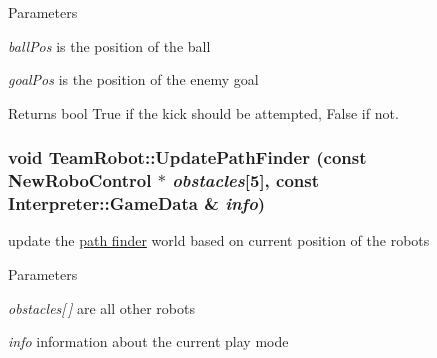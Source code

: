 \begin{DoxyParams}{Parameters}
\item[{\em ballPos}]is the position of the ball \item[{\em goalPos}]is the position of the enemy goal \end{DoxyParams}
\begin{DoxyReturn}{Returns}
bool True if the kick should be attempted, False if not. 
\end{DoxyReturn}
\hypertarget{classTeamRobot_a1216ffb71821002b6e6845390c990d5f}{
\subsubsection[{UpdatePathFinder}]{\setlength{\rightskip}{0pt plus 5cm}void TeamRobot::UpdatePathFinder (const {\bf NewRoboControl} $\ast$ {\em obstacles}\mbox{[}5\mbox{]}, \/  const {\bf Interpreter::GameData} \& {\em info})}}
\label{classTeamRobot_a1216ffb71821002b6e6845390c990d5f}


update the \hyperlink{classPathFinder}{path finder} world based on current position of the robots 


\begin{DoxyParams}{Parameters}
\item[{\em obstacles\mbox{[}$\,$\mbox{]}}]are all other robots \item[{\em info}]information about the current play mode \end{DoxyParams}


